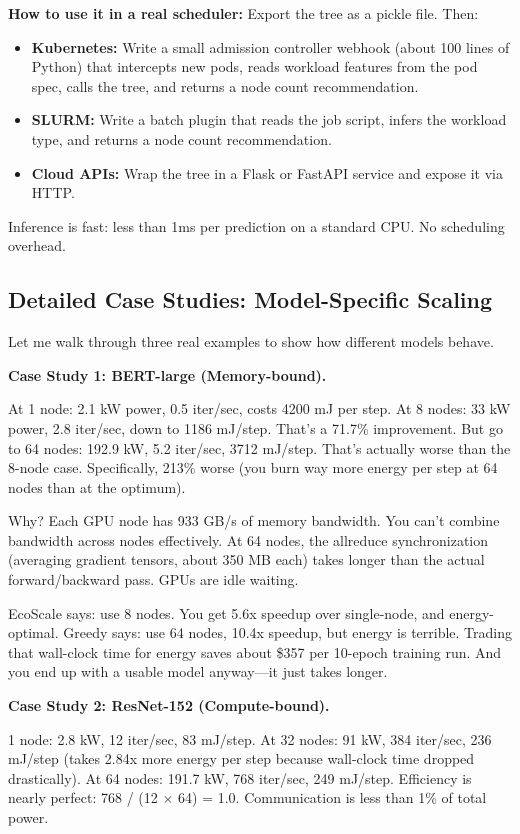 \documentclass[conference]{IEEEtran}
\begin{document}
\textbf{How to use it in a real scheduler:} Export the tree as a pickle file. Then:

\begin{itemize}
\item \textbf{Kubernetes:} Write a small admission controller webhook (about 100 lines of Python) that intercepts new pods, reads workload features from the pod spec, calls the tree, and returns a node count recommendation.
\item \textbf{SLURM:} Write a batch plugin that reads the job script, infers the workload type, and returns a node count recommendation.
\item \textbf{Cloud APIs:} Wrap the tree in a Flask or FastAPI service and expose it via HTTP.
\end{itemize}

Inference is fast: less than 1ms per prediction on a standard CPU. No scheduling overhead.

\subsection{Detailed Case Studies: Model-Specific Scaling}

Let me walk through three real examples to show how different models behave.

\textbf{Case Study 1: BERT-large (Memory-bound).}

At 1 node: 2.1 kW power, 0.5 iter/sec, costs 4200 mJ per step. At 8 nodes: 33 kW power, 2.8 iter/sec, down to 1186 mJ/step. That's a 71.7\% improvement. But go to 64 nodes: 192.9 kW, 5.2 iter/sec, 3712 mJ/step. That's actually worse than the 8-node case. Specifically, 213\% worse (you burn way more energy per step at 64 nodes than at the optimum).

Why? Each GPU node has 933 GB/s of memory bandwidth. You can't combine bandwidth across nodes effectively. At 64 nodes, the allreduce synchronization (averaging gradient tensors, about 350 MB each) takes longer than the actual forward/backward pass. GPUs are idle waiting.

EcoScale says: use 8 nodes. You get 5.6x speedup over single-node, and energy-optimal. Greedy says: use 64 nodes, 10.4x speedup, but energy is terrible. Trading that wall-clock time for energy saves about \$357 per 10-epoch training run. And you end up with a usable model anyway---it just takes longer.

\textbf{Case Study 2: ResNet-152 (Compute-bound).}

1 node: 2.8 kW, 12 iter/sec, 83 mJ/step. At 32 nodes: 91 kW, 384 iter/sec, 236 mJ/step (takes 2.84x more energy per step because wall-clock time dropped drastically). At 64 nodes: 191.7 kW, 768 iter/sec, 249 mJ/step. Efficiency is nearly perfect: 768 / (12 $\times$ 64) = 1.0. Communication is less than 1\% of total power.
\end{document}
